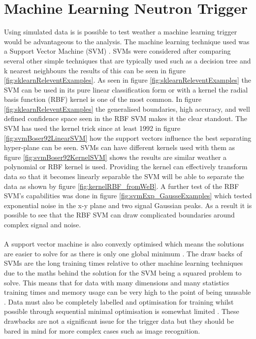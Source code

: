 \section{Machine Learning Neutron Trigger}\label{sec:MachineLearningTrigger}
Using simulated data is is possible to test weather a machine learning trigger would be advantageous to the analysis. The machine learning technique used was a Support Vector Machine (SVM) \cite{Boser92atraining} \cite{cortes1995support}. SVMs were considered after comparing several other simple techniques that are typically used such as a decision tree and k nearest neighbours the results of this can be seen in figure \ref{fig:sklearnReleventExamples}. As seen in figure \ref{fig:sklearnReleventExamples} the SVM can be used in its pure linear classification form or with a kernel the radial basis function (RBF) kernel is one of the most common. In figure \ref{fig:sklearnReleventExamples} the generalised boundaries, high accuracy, and well defined confidence space seen in the RBF SVM makes it the clear standout. The SVM has used the kernel trick since at least 1992 \cite{Boser92atraining} in figure \ref{fig:svmBoser92LinearSVM} how the support vectors influence the best separating hyper-plane can be seen. SVMs can have different kernels used with them as figure \ref{fig:svmBoser92KernelSVM} shows the results are similar weather a polynomial or RBF kernel is used. Providing the kernel can effectively transform data so that it becomes linearly separable the SVM will be able to separate the data as shown by figure \ref{fig:kernelRBF_fromWeB}. A further test of the RBF SVM's capabilities was done in figure \ref{fig:svmExp_GausseExamples} which tested exponential noise in the x-y plane and two signal Gaussian peaks. As a result it is possible to see that the RBF SVM can draw complicated boundaries around complex signal and noise. 
\\\\A support vector machine is also convexly optimised which means the solutions are easier to solve for as there is only one global minimum \cite{cortes1995support}. The draw backs of SVMs are the long training times relative to other machine learning techniques  due to the maths behind the solution for the SVM being a squared problem to solve\cite{cortes1995support}. This means that for data with many dimensions and many statistics training times and memory usage can be very high to the point of being unusable \cite{cortes1995support}. Data must also be completely labelled and optimisation for training whilst possible through sequential minimal optimisation is somewhat limited \cite{platt1998sequential}. These drawbacks are not a significant issue for the trigger data but they should be bared in mind for more complex cases such as image recognition.
 
